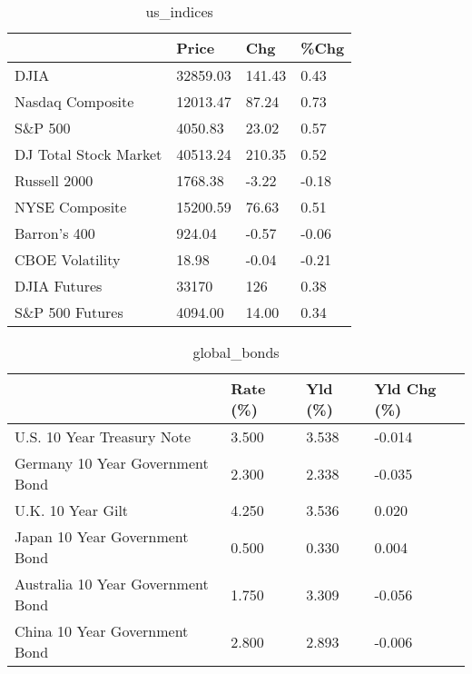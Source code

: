 \documentclass{article}%
\begin{document}
%


\begin{table}[htbp]%
\caption{us\_indices}%
\centering%
\begin{adjustbox}{width=1\textwidth}%
\begin{tabular}{llll}
\toprule
                      &    Price &    Chg &  \%Chg \\
\midrule
                 DJIA & 32859.03 & 141.43 &  0.43 \\
     Nasdaq Composite & 12013.47 &  87.24 &  0.73 \\
              S\&P 500 &  4050.83 &  23.02 &  0.57 \\
DJ Total Stock Market & 40513.24 & 210.35 &  0.52 \\
         Russell 2000 &  1768.38 &  -3.22 & -0.18 \\
       NYSE Composite & 15200.59 &  76.63 &  0.51 \\
         Barron's 400 &   924.04 &  -0.57 & -0.06 \\
      CBOE Volatility &    18.98 &  -0.04 & -0.21 \\
         DJIA Futures &    33170 &    126 &  0.38 \\
      S\&P 500 Futures &  4094.00 &  14.00 &  0.34 \\
\bottomrule
\end{tabular}
%
\end{adjustbox}%
\end{table}

%


\begin{table}[htbp]%
\caption{global\_bonds}%
\centering%
\begin{adjustbox}{width=1\textwidth}%
\begin{tabular}{llll}
\toprule
                                  & Rate (\%) & Yld (\%) & Yld Chg (\%) \\
\midrule
       U.S. 10 Year Treasury Note &    3.500 &   3.538 &      -0.014 \\
  Germany 10 Year Government Bond &    2.300 &   2.338 &      -0.035 \\
                U.K. 10 Year Gilt &    4.250 &   3.536 &       0.020 \\
    Japan 10 Year Government Bond &    0.500 &   0.330 &       0.004 \\
Australia 10 Year Government Bond &    1.750 &   3.309 &      -0.056 \\
    China 10 Year Government Bond &    2.800 &   2.893 &      -0.006 \\
\bottomrule
\end{tabular}
%
\end{adjustbox}%
\end{table}
\end{document}
